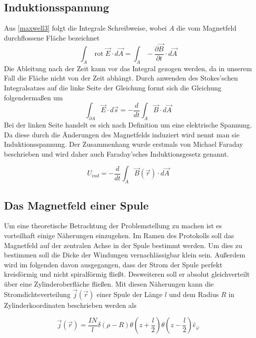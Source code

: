 \documentclass{article}
\begin{document}
\subsection{Induktionsspannung}
Aus \eqref{maxwell3} folgt die Integrale Schreibweise, wobei \(A\) die vom Magnetfeld durchflossene Fläche bezeichnet
\begin{equation*}
\int_{A}\operatorname{rot} \vec{E} \cdot d\vec{A} =  
\int_{A} -\frac{\partial \vec{B}}{\partial t} \cdot d\vec{A}
\end{equation*}
Die Ableitung nach der Zeit kann vor das Integral gezogen werden, da in unserem Fall die Fläche nicht von der Zeit abhängt. Durch anwenden des {\sc Stokes'schen Integralsatzes} auf die linke Seite der Gleichung formt sich die Gleichung folgendermaßen um
\begin{equation*}
\int_{\partial A}\vec{E} \cdot d\vec{s} =  
-\frac{d}{dt} \int_{A} \vec{B} \cdot d\vec{A}
\end{equation*}
Bei der linken Seite handelt es sich nach Definition um eine {\sc elektrische Spannung}. Da diese durch die Änderungen des Magnetfelds induziert wird nennt man sie Induktionsspannung. Der Zusammenhang wurde erstmals von Michael Faraday beschrieben und wird daher auch {\sc Faraday'sches Induktionsgesetz} genannt.

\begin{equation}\label{faraday}
U_{ind} =  
-\frac{d}{dt} \int_{A} \vec{B}(\vec{r}) \cdot d\vec{A}
\end{equation}

\subsection{Das Magnetfeld einer Spule}
Um eine theoretische Betrachtung der Problemstellung zu machen ist es vorteilhaft einige Näherungen einzugehen. Im Ramen des Protokolls soll das Magnetfeld auf der zentralen Achse in der Spule bestimmt werden. Um dies zu bestimmen soll die Dicke der Windungen vernachlässigbar klein sein. Außerdem wird im folgenden davon ausgegangen, dass der Strom der Spule perfekt kreisförmig und nicht spiralförmig fließt. Desweiteren soll er absolut gleichverteilt über eine Zylinderoberfläche fließen. Mit diesen Näherungen kann die Stromdichteverteilung \( \vec{j}(\vec{r}) \) einer Spule der Länge \(l\) und dem Radius \(R\) in Zylinderkoordinaten beschrieben werden als

\begin{equation}
\vec{j}(\vec{r}) = \frac{IN}{l}\delta(\rho - R) \theta(z+\frac{l}{2}) \theta(z-\frac{l}{2}) \hat{e}_\varphi
\end{equation}
\end{document}
